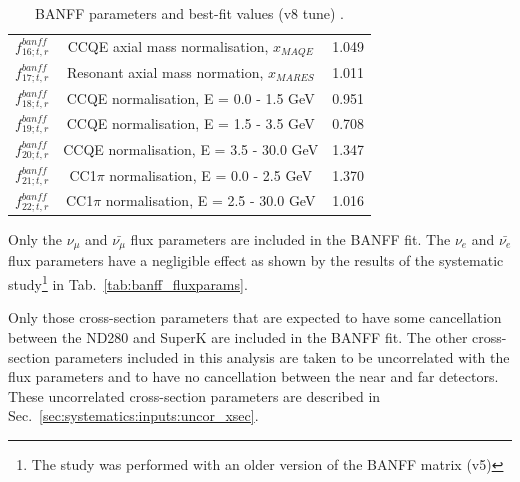 {\begin{table}
\begin{tabular}{| c | c | c |}
\hline
 $f_{16; t, r}^{banff}$  &  CCQE axial mass normalisation, $x_{MAQE}$                             & 1.049 \\
 $f_{17; t, r}^{banff}$  &  Resonant axial mass normation, $x_{MARES}$                        & 1.011 \\
 $f_{18; t, r}^{banff}$  &  CCQE normalisation, E = 0.0 - 1.5 GeV                     & 0.951 \\
 $f_{19; t, r}^{banff}$  &  CCQE normalisation, E = 1.5 - 3.5 GeV                     & 0.708 \\
 $f_{20; t, r}^{banff}$  &  CCQE normalisation, E = 3.5 - 30.0 GeV                    & 1.347 \\
 $f_{21; t, r}^{banff}$  &  CC1$\pi$ normalisation, E = 0.0 - 2.5 GeV                 & 1.370 \\
 $f_{22; t, r}^{banff}$  &  CC1$\pi$ normalisation, E = 2.5 - 30.0 GeV                & 1.016 \\
\hline
\end{tabular}
\caption{
  BANFF parameters and best-fit values (v8 tune) \cite{BANFF}.
}
\label{tab:banff_params}
\end{table}
}

Only the $\nu_\mu$ and $\bar{\nu_\mu}$ flux parameters are included in the BANFF fit.
The $\nu_e$ and $\bar{\nu_e}$ flux parameters have a negligible effect as shown by the results of the systematic study\footnote{
  The study was performed with an older version of the BANFF matrix (v5)} 
in Tab.\ \ref{tab:banff_fluxparams}.

Only those cross-section parameters that are expected to have some cancellation between the ND280 and SuperK are included in the BANFF fit.
The other cross-section parameters included in this analysis are taken to be uncorrelated with the flux parameters
and to have no cancellation between the near and far detectors.
These uncorrelated cross-section parameters are described in Sec.\ \ref{sec:systematics:inputs:uncor_xsec}.

